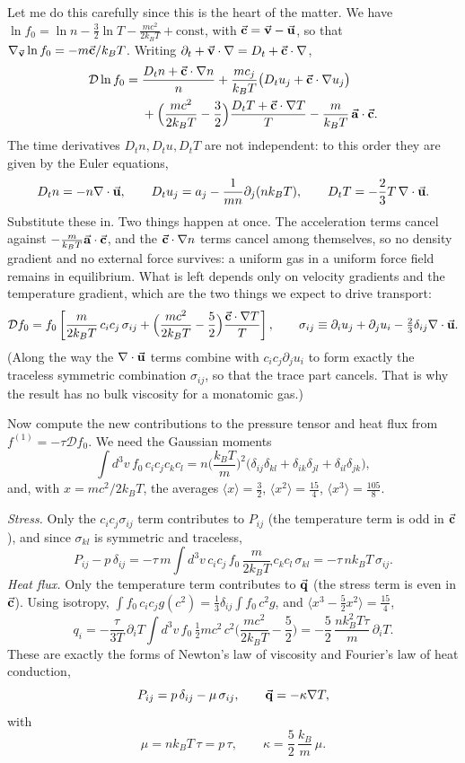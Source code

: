 Let me do this carefully since this is the heart of the matter. We have $\ln f_0=\ln n-\tfrac32\ln T-\frac{mc^2}{2k_BT}+\text{const}$, with $\va c=\va v-\va u$, so that $\nabla_{\va v}\ln f_0=-m\va c/k_BT$. Writing $\partial_t+\va v\cdot\nabla=D_t+\va c\cdot\nabla$,
\[
\begin{aligned}
\mathcal D\ln f_0={}&\frac{D_tn+\va c\cdot\nabla n}{n}
+\frac{m c_j}{k_BT}\big(D_tu_j+\va c\cdot\nabla u_j\big) \\
&+\Big(\frac{mc^2}{2k_BT}-\frac32\Big)\frac{D_tT+\va c\cdot\nabla T}{T}
-\frac{m}{k_BT}\,\va a\cdot\va c .
\end{aligned}
\]
The time derivatives $D_tn,D_tu,D_tT$ are not independent: to this order they are given by the Euler equations,
\[
D_tn=-n\nabla\cdot\va u,\qquad D_tu_j=a_j-\frac{1}{mn}\partial_j(nk_BT),\qquad D_tT=-\frac23T\,\nabla\cdot\va u .
\]
Substitute these in. Two things happen at once. The acceleration terms cancel against $-\frac{m}{k_BT}\va a\cdot\va c$, and the $\va c\cdot\nabla n$ terms cancel among themselves, so no density gradient and no external force survives: a uniform gas in a uniform force field remains in equilibrium. What is left depends only on velocity gradients and the temperature gradient, which are the two things we expect to drive transport:
\[
\mathcal Df_0=f_0\left[\frac{m}{2k_BT}\,c_ic_j\,\sigma_{ij}+\Big(\frac{mc^2}{2k_BT}-\frac52\Big)\frac{\va c\cdot\nabla T}{T}\right],
\qquad
\sigma_{ij}\equiv\partial_iu_j+\partial_ju_i-\tfrac23\delta_{ij}\nabla\cdot\va u .
\]
(Along the way the $\nabla\cdot\va u$ terms combine with $c_ic_j\partial_ju_i$ to form exactly the traceless symmetric combination $\sigma_{ij}$, so that the trace part cancels. That is why the result has no bulk viscosity for a monatomic gas.)

Now compute the new contributions to the pressure tensor and heat flux from $f^{(1)}=-\tau\mathcal Df_0$. We need the Gaussian moments
\[
\int d^3v\,f_0\,c_ic_jc_kc_l=n\Big(\frac{k_BT}{m}\Big)^2\big(\delta_{ij}\delta_{kl}+\delta_{ik}\delta_{jl}+\delta_{il}\delta_{jk}\big),
\]
and, with $x=mc^2/2k_BT$, the averages $\langle x\rangle=\tfrac32$, $\langle x^2\rangle=\tfrac{15}4$, $\langle x^3\rangle=\tfrac{105}8$.

\emph{Stress.} Only the $c_ic_j\sigma_{ij}$ term contributes to $P_{ij}$ (the temperature term is odd in $\va c$), and since $\sigma_{kl}$ is symmetric and traceless,
\[
P_{ij}-p\,\delta_{ij}=-\tau\,m\int d^3v\,c_ic_j\,f_0\,\frac{m}{2k_BT}\,c_kc_l\,\sigma_{kl}=-\tau\,nk_BT\,\sigma_{ij}.
\]
\emph{Heat flux.} Only the temperature term contributes to $\va q$ (the stress term is even in $\va c$). Using isotropy, $\int f_0\,c_ic_jg(c^2)=\tfrac13\delta_{ij}\int f_0\,c^2g$, and $\langle x^3-\tfrac52x^2\rangle=\tfrac{15}4$,
\[
q_i=-\frac{\tau}{3T}\,\partial_iT\int d^3v\,f_0\,\tfrac12mc^2\,c^2\Big(\frac{mc^2}{2k_BT}-\frac52\Big)=-\frac52\,\frac{nk_B^2T\tau}{m}\,\partial_iT .
\]
These are exactly the forms of Newton's law of viscosity and Fourier's law of heat conduction,
\[
P_{ij}=p\,\delta_{ij}-\mu\,\sigma_{ij},\qquad \va q=-\kappa\nabla T,
\]
with
\[
\mu=nk_BT\,\tau=p\,\tau,\qquad \kappa=\frac52\,\frac{k_B}{m}\,\mu .
\]

